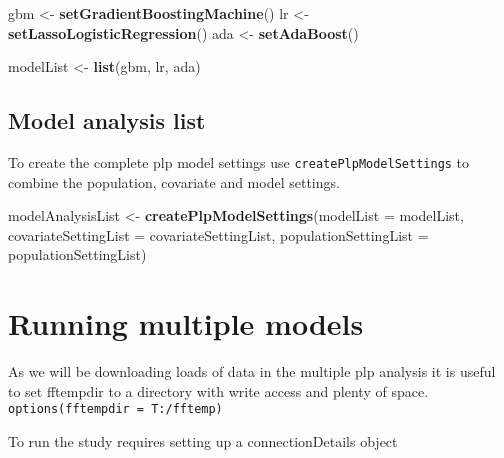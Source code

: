 \documentclass[]{article}
\newenvironment{Shaded}{\begin{snugshade}}{\end{snugshade}}
\newcommand{\KeywordTok}[1]{\textcolor[rgb]{0.13,0.29,0.53}{\textbf{#1}}}
\newcommand{\DataTypeTok}[1]{\textcolor[rgb]{0.13,0.29,0.53}{#1}}
\newcommand{\StringTok}[1]{\textcolor[rgb]{0.31,0.60,0.02}{#1}}
\newcommand{\NormalTok}[1]{#1}
\begin{document}
\begin{Shaded}
\begin{Highlighting}[]
\NormalTok{gbm <-}\StringTok{ }\KeywordTok{setGradientBoostingMachine}\NormalTok{()}
\NormalTok{lr <-}\StringTok{ }\KeywordTok{setLassoLogisticRegression}\NormalTok{()}
\NormalTok{ada <-}\StringTok{ }\KeywordTok{setAdaBoost}\NormalTok{()}

\NormalTok{modelList <-}\StringTok{ }\KeywordTok{list}\NormalTok{(gbm, lr, ada)}
\end{Highlighting}
\end{Shaded}

\subsection{Model analysis list}\label{model-analysis-list}

To create the complete plp model settings use
\texttt{createPlpModelSettings} to combine the population, covariate and
model settings.

\begin{Shaded}
\begin{Highlighting}[]
\NormalTok{modelAnalysisList <-}\StringTok{ }\KeywordTok{createPlpModelSettings}\NormalTok{(}\DataTypeTok{modelList =}\NormalTok{ modelList, }
                                   \DataTypeTok{covariateSettingList =}\NormalTok{ covariateSettingList,}
                                   \DataTypeTok{populationSettingList =}\NormalTok{ populationSettingList)}
\end{Highlighting}
\end{Shaded}

\section{Running multiple models}\label{running-multiple-models}

As we will be downloading loads of data in the multiple plp analysis it
is useful to set fftempdir to a directory with write access and plenty
of space.
\texttt{options(fftempdir\ =\ \textquotesingle{}T:/fftemp\textquotesingle{})}

To run the study requires setting up a connectionDetails object
\end{document}

